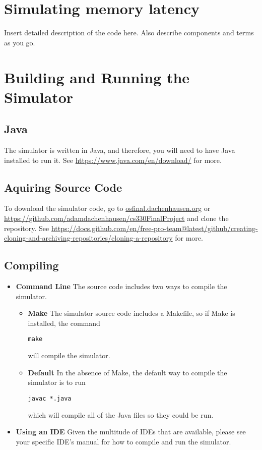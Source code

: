 \documentclass[12pt]{article}
\begin{document}
\section{Simulating memory latency}
\label{sec:memlate}

Insert detailed description of the code here. 
Also describe components and terms as you go. 

\section{Building and Running the Simulator}
\label{sec:build}

\subsection{Java}
The simulator is written in Java, and therefore, you will need to have
Java installed to run it. See \url{https://www.java.com/en/download/}
 for more.

\subsection{Aquiring Source Code}
To download the simulator code, go to \url{osfinal.dachenhausen.org} 
or
\url{https://github.com/adamdachenhausen/cs330FinalProject} 
and clone the repository. See \url{https://docs.github.com/en/free-pro-team@latest/github/creating-cloning-and-archiving-repositories/cloning-a-repository}
for more.

\subsection{Compiling}
\begin{itemize}

\item \textbf{Command Line}
  The source code includes two ways to compile the simulator.
  \begin{itemize}
  \item \textbf{Make}
  The simulator source code includes a Makefile, so if Make is installed, the command
  \begin{verbatim}make\end{verbatim}
  will compile the simulator.
  \item \textbf{Default}
  In the absence of Make, the default way to compile the simulator is to run  
  \begin{verbatim}javac *.java\end{verbatim}
  which will compile all of the Java files so they could be run.
  \end{itemize}
\item \textbf{Using an IDE}
  Given the multitude of IDEs that are available, please see your
  specific IDE's manual for how to compile and run the simulator.
  
\end{itemize}
\end{document}
